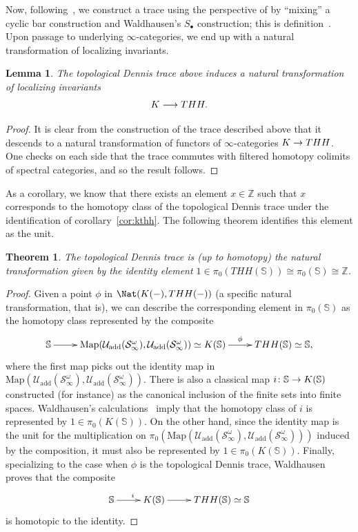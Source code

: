 \documentclass{amsart}
\newcommand{\ssdot}{\bullet}%
\newcommand{\Sdot}[1][\ssdot]{S_{#1}}
\newcommand{\htp}{\simeq}
\renewcommand{\to}{\mathchoice{\longrightarrow}{\rightarrow}{\rightarrow}{\rightarrow}}
\newcommand{\cU}{{\mathcal U}}
\let\catsymbfont\mathcal
\newcommand{\aS}{{\catsymbfont{S}}}
\newcommand{\bZ}{{\mathbb{Z}}}
\newcommand{\Map}{\mathrm{Map}}%
\newcommand{\bbS}{\mathbb{S}}
\newcommand{\ispec}{\aS_{\infty}}
\renewcommand{\i}{\infty}
\newcommand{\Umot}{\cU_{\mathrm{add}}}
\numberwithin{equation}{section}
\newtheorem{theorem}[equation]{Theorem}
\newtheorem{lemma}[equation]{Lemma}
\theoremstyle{definition}
\begin{document}
Now, following~\cite[\S 5]{BM2}, we construct a trace using the
perspective of \cite{McCarthy2} by ``mixing'' a cyclic bar
construction and Waldhausen's $\Sdot$ construction; this is
definition~\cite[5.12]{BM2}.  Upon passage to underlying
$\i$-categories, we end up with a natural transformation of localizing
invariants.

\begin{lemma}\label{lem:dendesc}
The topological Dennis trace above induces a natural transformation of 
localizing invariants
\[
K \to THH.
\]
\end{lemma}

\begin{proof}
It is clear from the construction of the trace described above that it
descends to a natural transformation of functors of $\i$-categories $K \to THH$.
One checks on each side that the trace commutes with filtered homotopy
colimits of spectral categories, and so the result follows.
\end{proof}

As a corollary, we know that there exists an element $x \in \bZ$ such
that $x$ corresponds to the homotopy class of the topological Dennis
trace under the identification of corollary~\ref{cor:kthh}.  The
following theorem identifies this element as the unit.

\begin{theorem}\label{thm:tunit}
The topological Dennis trace is (up to homotopy) the natural
transformation given by the identity element $1 \in \pi_0(THH(\bbS))\cong\pi_0(\bbS)
\cong\bZ$. 
\end{theorem}

\begin{proof}
Given a point $\phi$ in $\Nat(K(-),THH(-))$ (a specific natural
transformation, that is), we can describe the corresponding element in
$\pi_0(\bbS)$ as the homotopy class represented by the composite
\[
\xymatrix{
\bbS \ar[r] & \Map(\Umot(\ispec^{\omega}),\Umot(\ispec^{\omega})) \htp K(\bbS)
\ar[r]^-{\phi} & THH(\bbS) \htp \bbS,
}
\]
where the first map picks out the identity map in
$\Map(\Umot(\ispec^{\omega}),\Umot(\ispec^{\omega}))$.  There is also
a classical map $i \colon \bbS \to K(\bbS)$ constructed (for instance)
as the canonical inclusion of the finite sets into finite spaces.
Waldhausen's calculations~\cite[\S 5]{WaldA2} imply that the homotopy
class of $i$ is represented by $1 \in \pi_0(K(\bbS))$.  On the other
hand, since the identity map is the unit for the multiplication on
$\pi_0(\Map(\Umot(\ispec^{\omega}),\Umot(\ispec^{\omega})))$ induced
by the composition, it must also be represented by
$1 \in \pi_0(K(\bbS))$. 
Finally, specializing to the case when $\phi$ is the topological
Dennis trace, Waldhausen \cite[5.2]{WaldA2} proves that the composite
\[
\xymatrix{
\bbS \ar[r]^i & K(\bbS) \ar[r] & THH(\bbS) \htp \bbS
}
\]
is homotopic to the identity.
\end{proof}
\end{document}
